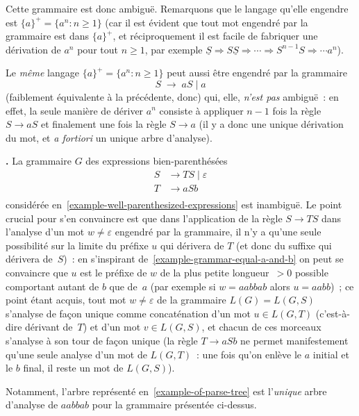 \documentclass[12pt,a4paper]{article}
\theoremstyle{definition}
\newcommand\thingy{%
\refstepcounter{comcnt}\medskip\noindent\textbf{\thecomcnt.} }
\begin{document}
Cette grammaire est donc ambiguë.  Remarquons que le langage
qu'elle engendre est $\{a\}^+ = \{a^n : n\geq 1\}$ (car il est évident
que tout mot engendré par la grammaire est dans $\{a\}^+$, et
réciproquement il est facile de fabriquer une dérivation de $a^n$ pour
tout $n\geq 1$, par exemple $\underline{S} \Rightarrow S\underline{S}
\Rightarrow \cdots \Rightarrow S^{n-1} S \Rightarrow \cdots a^n$).

Le \emph{même} langage $\{a\}^+ = \{a^n : n\geq 1\}$ peut aussi être
engendré par la grammaire
\[
S\; \rightarrow\; aS \;|\; a
\]
(faiblement équivalente à la précédente, donc) qui, elle, \emph{n'est
  pas} ambiguë : en effet, la seule manière de dériver $a^n$ consiste
à appliquer $n-1$ fois la règle $S \rightarrow aS$ et finalement une
fois la règle $S \rightarrow a$ (il y a donc une unique dérivation du
mot, et \textit{a fortiori} un unique arbre d'analyse).

\thingy\label{inambiguity-of-well-parenthesized-expressions} La
grammaire $G$ des expressions bien-parenthésées
\[
\begin{aligned}
S &\rightarrow TS \;|\; \varepsilon\\
T &\rightarrow aSb\\
\end{aligned}
\]
considérée en \ref{example-well-parenthesized-expressions} est
inambiguë.  Le point crucial pour s'en convaincre est que dans
l'application de la règle $S \rightarrow TS$ dans l'analyse d'un mot
$w \neq \varepsilon$ engendré par la grammaire, il n'y a qu'une seule
possibilité sur la limite du préfixe $u$ qui dérivera de $T$ (et donc
du suffixe qui dérivera de $S$) : en s'inspirant
de \ref{example-grammar-equal-a-and-b} on peut se convaincre que $u$
est le préfixe de $w$ de la plus petite longueur $>0$ possible
comportant autant de $b$ que de $a$ (par exemple si $w = aabbab$ alors
$u = aabb$) ; ce point étant acquis, tout mot $w\neq\varepsilon$ de la
grammaire $L(G) = L(G,S)$ s'analyse de façon unique comme
concaténation d'un mot $u \in L(G,T)$ (c'est-à-dire dérivant de $T$)
et d'un mot $v \in L(G,S)$, et chacun de ces morceaux s'analyse à son
tour de façon unique (la règle $T \rightarrow aSb$ ne permet
manifestement qu'une seule analyse d'un mot de $L(G,T)$ : une fois
qu'on enlève le $a$ initial et le $b$ final, il reste un mot de
$L(G,S)$).

Notamment, l'arbre représenté en \ref{example-of-parse-tree} est
l'\emph{unique} arbre d'analyse de $aabbab$ pour la grammaire
présentée ci-dessus.
\end{document}
